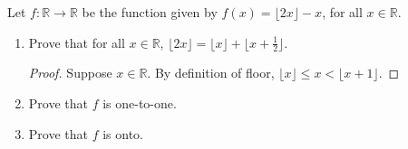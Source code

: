 \documentclass[12pt]{article}
\begin{document}
Let $f : \mathbb{R} \rightarrow \mathbb{R}$ be the function given by $f(x) = \lfloor 2x \rfloor - x$, for all $x \in \mathbb{R}$.

\begin{enumerate}[label=\textbf{\alph*.}]

\item Prove that for all $x \in \mathbb{R}$, $\lfloor 2x \rfloor = \lfloor x \rfloor + \lfloor x + \frac{1}{2} \rfloor$.
\begin{proof}
    Suppose $x \in \mathbb{R}$. By definition of floor, $\lfloor x \rfloor \leq x < \lfloor x + 1 \rfloor$.
\end{proof}


\item Prove that $f$ is one-to-one.


\item Prove that $f$ is onto.


\end{enumerate}
\end{document}
